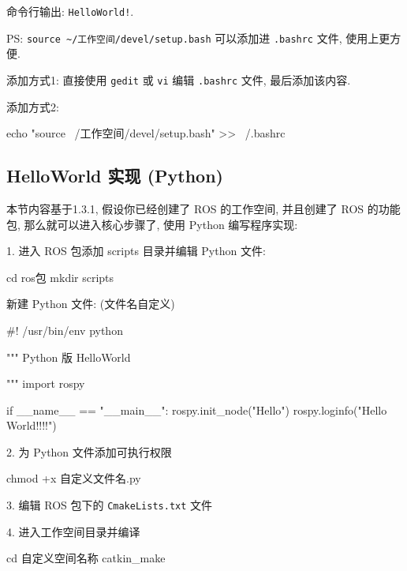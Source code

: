 \documentclass[openany, fontset=windowsold]{ctexbook}
\theoremstyle{kaiti}
\theoremstyle{normal}
\begin{document}
命令行输出: \verb|HelloWorld!|.

PS: \verb|source ~/工作空间/devel/setup.bash| 可以添加进 \verb|.bashrc| 文件, 使用上更方便.

添加方式1: 直接使用 \verb|gedit| 或 \verb|vi| 编辑 \verb|.bashrc| 文件, 最后添加该内容.

添加方式2:

\begin{bash}
  echo "source ~/工作空间/devel/setup.bash" >> ~/.bashrc
\end{bash}

\subsection{HelloWorld 实现 (Python)}

本节内容基于1.3.1, 假设你已经创建了 ROS 的工作空间, 并且创建了 ROS 的功能包, 那么就可以进入核心步骤了, 使用 Python 编写程序实现:

1. 进入 ROS 包添加 scripts 目录并编辑 Python 文件:

\begin{bash}
  cd ros包
  mkdir scripts
\end{bash}

新建 Python 文件: (文件名自定义)

\begin{python}
  #! /usr/bin/env python

  """
      Python 版 HelloWorld

  """
  import rospy

  if __name__ == "__main__":
      rospy.init_node("Hello")
      rospy.loginfo("Hello World!!!!")
\end{python}

2. 为 Python 文件添加可执行权限

\begin{bash}
  chmod +x 自定义文件名.py
\end{bash}

3. 编辑 ROS 包下的 \verb|CmakeLists.txt| 文件


4. 进入工作空间目录并编译

\begin{bash}
  cd 自定义空间名称
  catkin_make
\end{bash}
\end{document}
